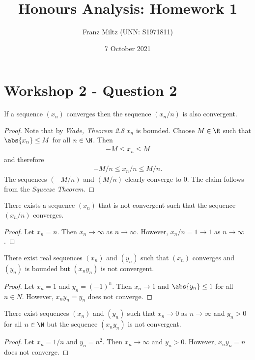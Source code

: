 \documentclass{article}
\begin{document}
\title{Honours Analysis: Homework 1}
\author{Franz Miltz (UNN: S1971811)}
\date{7 October 2021}
\maketitle

\section{Workshop 2 - Question 2}

\begin{claim}
   If a sequence $(x_n)$ converges then the sequence $(x_n/n)$ is also convergent.
\end{claim}
\begin{proof}
   Note that by \emph{Wade, Theorem 2.8} $x_n$ is bounded. Choose $M\in\R$ such that
   $\abs{x_n}\leq M$ for all $n\in\N$. Then
   \begin{align*}
      -M \leq x_n \leq M
   \end{align*}
   and therefore
   \begin{align*}
      -M/n \leq x_n / n \leq M/n.
   \end{align*}
   The sequences $(-M/n)$ and $(M/n)$ clearly converge to $0$. The claim follows from the
   \emph{Squeeze Theorem}.
\end{proof}

\begin{claim}
   There exists a sequence $(x_n)$ that is not convergent such that the sequence $(x_n/n)$ converges.
\end{claim}
\begin{proof}
   Let $x_n=n$. Then $x_n\to\infty$ as $n\to\infty$. However,
   $x_n/n=1 \to 1$ as $n\to\infty$.
\end{proof}

\begin{claim}
   There exist real sequences $(x_n)$ and $(y_n)$ such that $(x_n)$ converges and $(y_n)$
   is bounded but $(x_ny_n)$ is not convergent.
\end{claim}
\begin{proof}
   Let $x_n=1$ and $y_n=(-1)^n$. Then $x_n\to 1$ and $\abs{y_n}\leq 1$ for all $n\in N$.
   However, $x_ny_n=y_n$ does not converge.
\end{proof}

\begin{claim}
   There exist sequences $(x_n)$ and $(y_n)$ such that $x_n\to 0$ as $n\to\infty$ and $y_n>0$
   for all $n\in\N$ but the sequence $(x_ny_n)$ is not convergent.
\end{claim}
\begin{proof}
   Let $x_n=1/n$ and $y_n=n^2$. Then $x_n\to\infty$ and $y_n>0$. However,
   $x_ny_n=n$ does not converge.
\end{proof}
\end{document}
